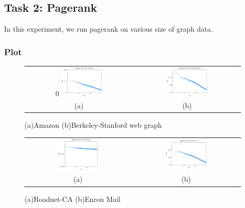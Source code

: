 \subsection{Task 2: Pagerank}
In this experiment, we run pagerank on various size of graph data.

\subsubsection{Plot}

\begin{figure}[h]
\begin{center}
\begin{tabular}{cc}0
     \includegraphics[width=0.4\textwidth]{FIG/t2_amazon.png} &
     \includegraphics[width=0.4\textwidth]{FIG/t2_berke.png} \\
    (a) & (b) 
\end{tabular}
\caption{(a)Amazon (b)Berkeley-Stanford web graph}
\label{t2:1}
\end{center}
\end{figure}

\begin{figure}[h]
\begin{center}
\begin{tabular}{cc}
     \includegraphics[width=0.4\textwidth]{FIG/t2_ca.png} &
     \includegraphics[width=0.4\textwidth]{FIG/t2_enron.png} \\
    (a) & (b) 
\end{tabular}
\caption{(a)Roadnet-CA (b)Enron Mail}
\label{t2:2}
\end{center}
\end{figure}


